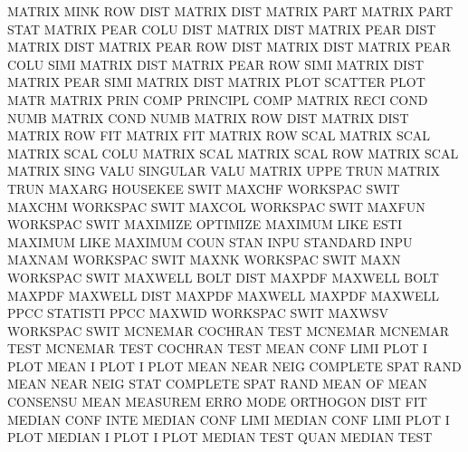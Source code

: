MATRIX   MINK ROW  DIST                 MATRIX   DIST
MATRIX   PART                           MATRIX   PART STAT
MATRIX   PEAR COLU DIST                 MATRIX   DIST
MATRIX   PEAR DIST                      MATRIX   DIST
MATRIX   PEAR ROW  DIST                 MATRIX   DIST
MATRIX   PEAR COLU SIMI                 MATRIX   DIST
MATRIX   PEAR ROW  SIMI                 MATRIX   DIST
MATRIX   PEAR SIMI                      MATRIX   DIST
MATRIX   PLOT                           SCATTER  PLOT MATR
MATRIX   PRIN COMP                      PRINCIPL COMP
MATRIX   RECI COND NUMB                 MATRIX   COND NUMB
MATRIX   ROW  DIST                      MATRIX   DIST
MATRIX   ROW  FIT                       MATRIX   FIT
MATRIX   ROW  SCAL                      MATRIX   SCAL
MATRIX   SCAL COLU                      MATRIX   SCAL
MATRIX   SCAL ROW                       MATRIX   SCAL
MATRIX   SING VALU                      SINGULAR VALU
MATRIX   UPPE TRUN                      MATRIX   TRUN
MAXARG                                  HOUSEKEE SWIT
MAXCHF                                  WORKSPAC SWIT
MAXCHM                                  WORKSPAC SWIT
MAXCOL                                  WORKSPAC SWIT
MAXFUN                                  WORKSPAC SWIT
MAXIMIZE                                OPTIMIZE
MAXIMUM  LIKE ESTI                      MAXIMUM  LIKE
MAXIMUM  COUN STAN INPU                 STANDARD INPU
MAXNAM                                  WORKSPAC SWIT
MAXNK                                   WORKSPAC SWIT
MAXN                                    WORKSPAC SWIT
MAXWELL  BOLT DIST                      MAXPDF
MAXWELL  BOLT                           MAXPDF
MAXWELL  DIST                           MAXPDF
MAXWELL                                 MAXPDF
MAXWELL  PPCC                           STATISTI PPCC
MAXWID                                  WORKSPAC SWIT
MAXWSV                                  WORKSPAC SWIT
MCNEMAR                                 COCHRAN  TEST
MCNEMAR                                 MCNEMAR  TEST
MCNEMAR  TEST                           COCHRAN  TEST
MEAN     CONF LIMI PLOT                 I        PLOT
MEAN     I    PLOT                      I        PLOT
MEAN     NEAR NEIG                      COMPLETE SPAT RAND
MEAN     NEAR NEIG STAT                 COMPLETE SPAT RAND
MEAN     OF   MEAN                      CONSENSU MEAN
MEASUREM ERRO MODE                      ORTHOGON DIST FIT
MEDIAN   CONF INTE                      MEDIAN   CONF LIMI
MEDIAN   CONF LIMI PLOT                 I        PLOT
MEDIAN   I    PLOT                      I        PLOT
MEDIAN   TEST QUAN                      MEDIAN   TEST
